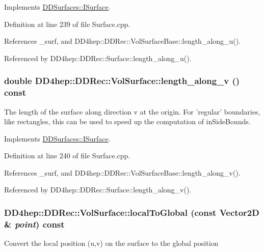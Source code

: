 Implements \hyperlink{class_d_d_surfaces_1_1_i_surface_a0060710912d3447e296a8e0875690cc9}{DDSurfaces::ISurface}.

Definition at line 239 of file Surface.cpp.

References \_\-surf, and DD4hep::DDRec::VolSurfaceBase::length\_\-along\_\-u().

Referenced by DD4hep::DDRec::Surface::length\_\-along\_\-u().\hypertarget{class_d_d4hep_1_1_d_d_rec_1_1_vol_surface_acf14d37efeb8c9baaeba295f9e0fa38f}{
\subsubsection[{length\_\-along\_\-v}]{\setlength{\rightskip}{0pt plus 5cm}double DD4hep::DDRec::VolSurface::length\_\-along\_\-v () const}}
\label{class_d_d4hep_1_1_d_d_rec_1_1_vol_surface_acf14d37efeb8c9baaeba295f9e0fa38f}
The length of the surface along direction v at the origin. For 'regular' boundaries, like rectangles, this can be used to speed up the computation of inSideBounds. 

Implements \hyperlink{class_d_d_surfaces_1_1_i_surface_a9a4682bfa68557d53cfd319cfa54148d}{DDSurfaces::ISurface}.

Definition at line 240 of file Surface.cpp.

References \_\-surf, and DD4hep::DDRec::VolSurfaceBase::length\_\-along\_\-v().

Referenced by DD4hep::DDRec::Surface::length\_\-along\_\-v().\hypertarget{class_d_d4hep_1_1_d_d_rec_1_1_vol_surface_a784a48baa6fa269f2c626acce19f1154}{
\subsubsection[{localToGlobal}]{ DD4hep::DDRec::VolSurface::localToGlobal (const {\bf Vector2D} \& {\em point}) const}}
\label{class_d_d4hep_1_1_d_d_rec_1_1_vol_surface_a784a48baa6fa269f2c626acce19f1154}
Convert the local position (u,v) on the surface to the global position 

